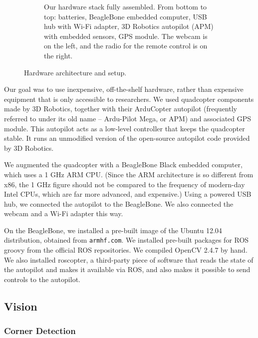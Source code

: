 \documentclass[10pt]{scrartcl} %
\begin{document}
\begin{figure}[h!]
\begin{subfigure}[b]{0.9\textwidth}
        \caption{
            Our hardware stack fully assembled. From bottom to top: batteries,
            BeagleBone embedded computer, USB hub with Wi-Fi adapter, 3D
            Robotics autopilot (APM) with embedded sensors, GPS module. The
            webcam is on the left, and the radio for the remote control is on
            the right.
        }
    \end{subfigure}
    \caption{Hardware architecture and setup.}
    \label{fig:hardware}
\end{figure}

Our goal was to use inexpensive, off-the-shelf hardware, rather than expensive
equipment that is only accessible to researchers. We used quadcopter components
made by 3D Robotics, together with their ArduCopter autopilot (frequently
referred to under its old name -- Ardu-Pilot Mega, or APM) and associated GPS
module. This autopilot acts as a low-level controller that keeps the quadcopter
stable. It runs an unmodified version of the open-source autopilot code
provided by 3D Robotics.

We augmented the quadcopter with a BeagleBone Black embedded computer, which
uses a 1 GHz ARM CPU. (Since the ARM architecture is so different from x86,
the 1 GHz figure should not be compared to the frequency of modern-day Intel
CPUs, which are far more advanced, and expensive.) Using a powered USB hub, we
connected the autopilot to the BeagleBone. We also connected the webcam and a
Wi-Fi adapter this way.


On the BeagleBone, we installed a pre-built image of the Ubuntu 12.04
distribution, obtained from {\tt armhf.com}. We installed pre-built packages
for ROS groovy from the official ROS repositories. We compiled OpenCV 2.4.7 by
hand. We also installed roscopter, a third-party piece of software that reads
the state of the autopilot and makes it available via ROS, and also makes it
possible to send controls to the autopilot.


\subsection{Vision}

\subsubsection{Corner Detection}
\end{document}
